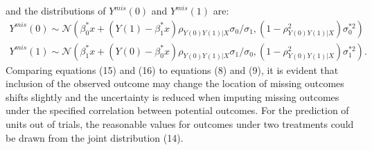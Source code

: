 	and the distributions of $Y^{mis}(0)$ and $Y^{mis}(1)$ are:
	\begin{align}
		Y^{mis}(0) \sim \mathcal{N} (\beta^{*}_{0}x + (Y(1) - \beta^{*}_{1}x)\rho_{Y(0)Y(1)|X}\sigma_{0} / \sigma_{1}, (1 - \rho_{Y(0)Y(1)|X}^2)\sigma^{*2}_{0})\\
		Y^{mis}(1) \sim \mathcal{N} (\beta^{*}_{1}x + (Y(0) - \beta^{*}_{0}x)\rho_{Y(0)Y(1)|X}\sigma_{1} / \sigma_{0}, (1 - \rho_{Y(0)Y(1)|X}^2)\sigma^{*2}_{1}).
	\end{align}
	Comparing equations (15) and (16) to equations (8) and (9), it is evident that inclusion of the observed outcome may change the location of missing outcomes shifts slightly and the uncertainty is reduced when imputing missing outcomes under the specified correlation between potential outcomes. For the prediction of units out of trials, the reasonable values for outcomes under two treatments could be drawn from the joint distribution (14). 
	
